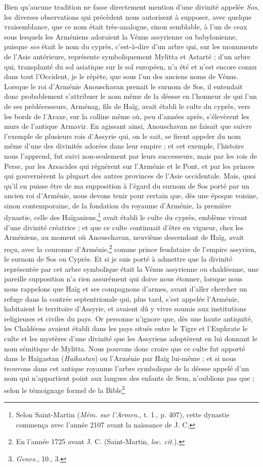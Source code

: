 \documentclass[a4paper, 11pt, oneside, polutonikogreek, french]{article}
\begin{document}
Bien qu'aucune tradition ne fasse directement mention d'une divinité appelée \emph{Sos}, les diverses observations qui précèdent nous autorisent à supposer, avec quelque vraisemblance, que ce nom était très-analogue, sinon semblable, à l'un de ceax sous lesquels les Arméniens adoraient la Vénus assyrienne ou babylonienne, puisque \emph{sos} était le nom du cyprès, c'est-à-dire d'un arbre qui, sur les monuments de l'Asie antérieure, représente symboliquement Mylitta et Astarté ; d'un arbre qui, transplanté du sol asiatique sur le sol européen, n'a été et n'est encore connu dans tout l'Occident, je le répète, que sous l'un des anciens noms de Vénus. Lorsque le roi d'Arménie Anouschavan prenait le surnom de Sos, il entendait donc probablement s'attribuer le nom même de la déesse en l'honneur de qui l'un de ses prédécesseurs, Arménag, fils de Haïg, avait établi le culte du cyprès, vers les bords de l'Araxe, sur la colline même où, peu d'années après, s'élevèrent les murs de l'antique Armavir. En agissant ainsi, Anouschavan ne faisait que suivre l'exemple de plusieurs rois d'Assyrie qui, on le sait, se firent appeler du nom même d'une des divinités adorées dans leur empire ; et cet exemple, l'histoire nous l'apprend, fut suivi non-seulement par leurs successeurs, mais par les rois de Perse, par les Arsacides qui régnèrent sur l'Arménie et le Pont, et par les princes qui gouvernèrent la plupart des autres provinces de l'Asie occidentale. Mais, quoi qu'il en puisse être de ma supposition à l'égard du surnom de Sos porté par un ancien roi d'Arménie, nous devons tenir pour certain que, dès une époque voisine, sinon contemporaine, de la fondation du royaume d'Arménie, la première dynastie, celle des Haïganiens,\footnote{Selon Saint-Martin (\emph{Mém. sur l'Armen.}, t. 1., p. 407), cette dynastie commença avec l'année 2107 avant la naissance de J. C.} avait établi le culte du cyprès, emblème vivant d'une divinité créatrice ; et que ce culte continuait d'être en vigueur, chez les Arméniens, au moment où Anouschavan, neuvième descendant de Haïg, avait reçu, avec la couronne d'Arménie,\footnote{En l'année 1725 avant J. C. (Saint-Martin, \emph{loc. cit.}).} comme prince feudataire de l'empire assyrien, le surnom de Sos ou Cyprès. Et si je suis porté à admettre que la divinité représentée par cet arbre symbolique était la Vénus assyrienne ou chaldéenne, une pareille supposition n'a rien assurément qui doive nous étonner, lorsque nous nous rappelons que Haïg et ses compagnons d'armes, avant d'aller chercher un refuge dans la contrée septentrionale qui, plus tard, s'est appelée l'Arménie, habitaient le territoire d'Assyrie, et avaient dû y vivre soumis aux institutions religieuses et civiles du pays. Or personne n'ignore que, dès une haute antiquité, les Chaldéens avaient établi dans les pays situés entre le Tigre et l'Euphrate le culte et les mystères d'une divinité que les Assyriens adoptèrent en lui donnant le nom sémitique de Mylitta. Nous pouvons donc croire que ce culte fut apporté dans le Haïgastan (\emph{Haïkastan}) ou l'Arménie par Haïg lui-même ; et si nous trouvons dans cet antique royaume l'arbre symbolique de la déesse appelé d'un nom qui n'appartient point aux langues des enfants de Sem, n'oublions pas que ; selon le témoignage formel de la Bible\footnote{\emph{Genes.}, 10., 3.} 
\end{document}
